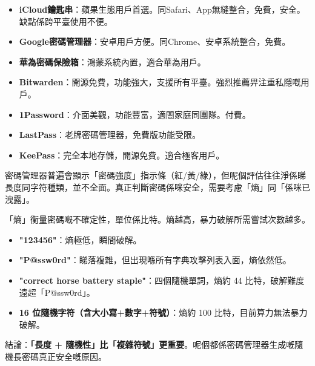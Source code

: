 

\begin{itemize}
  \item \textbf{iCloud鑰匙串}：蘋果生態用戶首選。同Safari、App無縫整合，免費，安全。缺點係跨平臺使用不便。
  \item \textbf{Google密碼管理器}：安卓用戶方便。同Chrome、安卓系統整合，免費。
  \item \textbf{華為密碼保險箱}：鴻蒙系統內置，適合華為用戶。
\end{itemize}


\begin{itemize}
  \item \textbf{Bitwarden}：開源免費，功能強大，支援所有平臺。強烈推薦畀注重私隱嘅用戶。
  \item \textbf{1Password}：介面美觀，功能豐富，適閤家庭同團隊。付費。
  \item \textbf{LastPass}：老牌密碼管理器，免費版功能受限。
  \item \textbf{KeePass}：完全本地存儲，開源免費。適合極客用戶。
\end{itemize}


密碼管理器普遍會顯示「密碼強度」指示條（紅/黃/綠），但呢個評估往往淨係睇長度同字符種類，並不全面。真正判斷密碼係咪安全，需要考慮「熵」同「係咪已洩露」。


「熵」衡量密碼嘅不確定性，單位係比特。熵越高，暴力破解所需嘗試次數越多。

\begin{itemize}
  \item \textbf{"123456"}：熵極低，瞬間破解。
  \item \textbf{"P@ssw0rd"}：睇落複雜，但出現喺所有字典攻擊列表入面，熵依然低。
  \item \textbf{"correct horse battery staple"}：四個隨機單詞，熵約 44 比特，破解難度遠超「P@ssw0rd」。
  \item \textbf{16 位隨機字符（含大小寫+數字+符號）}：熵約 100 比特，目前算力無法暴力破解。
\end{itemize}

結論：\textbf{「長度 + 隨機性」比「複雜符號」更重要}。呢個都係密碼管理器生成嘅隨機長密碼真正安全嘅原因。


